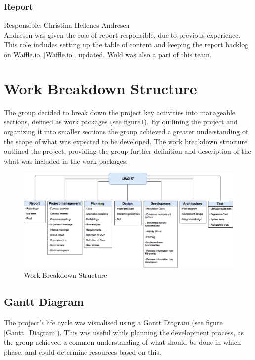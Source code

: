 \subsubsection{Report}
Responsible: Christina Hellenes Andresen\\
Andresen was given the role of report responsible, due to previous experience. This role includes setting up the table of content and keeping the report backlog on Waffle.io, \ref{Waffle.io}, updated. Wold was also a part of this team.


\section{Work Breakdown Structure}
The group decided to break down the project key activities into manageable sections, defined as work packages (see figure\ref{Work_Breakdown_Structure}). By outlining the project and organizing it into smaller sections the group achieved a greater understanding of the scope of what was expected to be developed. The work breakdown structure outlined the project, providing the group further definition and description of the what was included in the work packages. 

\begin{figure}[ht]
\centering
    \includegraphics[width=1\textwidth]{fig/work_packages_new}
\caption{Work Breakdown Structure}
\label{Work_Breakdown_Structure}
\end{figure}

\subsection{Gantt Diagram} \label{GanttDiagram}
The project's life cycle was visualised using a Gantt Diagram (see figure \ref{Gantt_Diagram}). This was useful while planning the development process, as the group achieved a common understanding of what should be done in which phase, and could determine resources based on this. 

